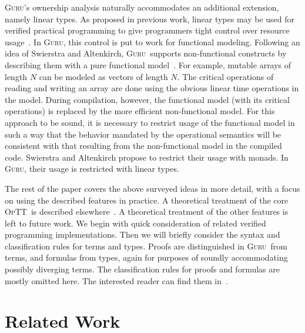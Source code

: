 \documentclass[9pt,natbib]{sigplanconf}
\newcommand{\optt}{\textsc{OpTT}}
\newcommand{\guru}[0]{\textsc{Guru}}
\begin{document}
\guru's ownership analysis naturally accommodates an additional
extension, namely linear types.  As proposed in previous work, linear
types may be used for verified practical programming to give
programmers tight control over resource usage~\cite{zhuxi-padl05}.  In
\guru, this control is put to work for functional modeling.  Following
an idea of Swierstra and Altenkirch, \guru\ supports non-functional
constructs by describing them with a pure functional
model~\cite{swierstra+07}.  For example, mutable arrays of length $N$
can be modeled as vectors of length $N$.  The critical operations of
reading and writing an array are done using the obvious linear time
operations in the model.  During compilation, however, the functional
model (with its critical operations) is replaced by the more efficient
non-functional model.  For this approach to be sound, it is necessary
to restrict usage of the functional model in such a way that the
behavior mandated by the operational semantics will be consistent with
that resulting from the non-functional model in the compiled code.
Swierstra and Altenkirch propose to restrict their usage with monads.
In \guru, their usage is restricted with linear types.

The rest of the paper covers the above surveyed ideas in more detail,
with a focus on using the described features in practice.  A
theoretical treatment of the core \optt\ is described
elsewhere~\cite{optt}.  A theoretical treatment of the other
features is left to future work.  We begin with quick consideration of
related verified programming implementations.  Then we will briefly
consider the syntax and classification rules for terms and types.
Proofs are distinguished in \guru\ from terms, and formulas from
types, again for purposes of soundly accommodating possibly diverging
terms.  The classification rules for proofs and formulas are mostly
omitted here.  The interested reader can find them in~\cite{optt}.

\section{Related Work}
\end{document}
